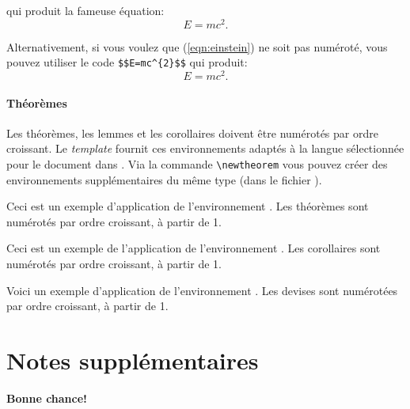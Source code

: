 \noindent qui produit la fameuse équation:
\begin{equation}
    E=mc^{2}.
    \label{eqn:einstein}
\end{equation}

Alternativement, si vous voulez que (\ref{eqn:einstein}) ne soit pas numéroté, vous pouvez utiliser le code \verb|$$E=mc^{2}$$| qui produit:
$$E=mc ^{2}.$$


\paragraph{Théorèmes}

Les théorèmes, les lemmes et les corollaires doivent être numérotés par ordre croissant. Le \textit{template} fournit ces environnements adaptés à la langue sélectionnée pour le document dans . Via la commande \verb|\newtheorem| vous pouvez créer des environnements supplémentaires du même type (dans le fichier ).

\begin{theorem}
Ceci est un exemple d'application de l'environnement . Les théorèmes sont numérotés par ordre croissant, à partir de 1.
\end{theorem}

\begin{corollary}
Ceci est un exemple de l'application de l'environnement . Les corollaires sont numérotés par ordre croissant, à partir de 1.
\end{corollary}

\begin{lemma}
Voici un exemple d'application de l'environnement . Les devises sont numérotées par ordre croissant, à partir de 1.
\end{lemma}

\clearpage
\section{Notes supplémentaires}

\textbf{Bonne chance!}